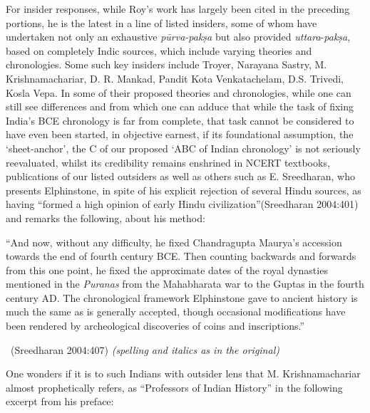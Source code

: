 For insider responses, while Roy’s work has largely been cited in the preceding portions, he is the latest in a line of listed insiders, some of whom have undertaken not only an exhaustive \textit{pūrva-pakṣa} but also provided \textit{uttara}-\textit{pakṣa}, based on completely Indic sources, which include varying theories and chronologies. Some such key insiders include Troyer, Narayana Sastry, M. Krishnamachariar, D. R. Mankad, Pandit Kota Venkatachelam, D.S. Trivedi, Kosla Vepa. In some of their proposed theories and chronologies, while one can still see differences and from which one can adduce that while the task of fixing India’s BCE chronology is far from complete, that task cannot be considered to have even been started, in objective earnest, if its foundational assumption, the ‘sheet-anchor’, the C of our proposed ‘ABC of Indian chronology’ is not seriously reevaluated, whilst its credibility remains enshrined in NCERT textbooks, publications of our listed outsiders as well as others such as E. Sreedharan, who presents Elphinstone, in spite of his explicit rejection of several Hindu sources, as having “formed a high opinion of early Hindu civilization”(Sreedharan 2004:401) and remarks the following, about his method:

\begin{myquote}
“And now, without any difficulty, he fixed Chandragupta Maurya’s accession towards the end of fourth century BCE. Then counting backwards and forwards from this one point, he fixed the approximate dates of the royal dynasties mentioned in the \textit{Puranas} from the Mahabharata war to the Guptas in the fourth century AD. The chronological framework Elphinstone gave to ancient history is much the same as is generally accepted, though occasional modifications have been rendered by archeological discoveries of coins and inscriptions.” 

~\hfill (Sreedharan 2004:407) \textit{(spelling and italics as in the original)}
\end{myquote}

One wonders if it is to such Indians with outsider lens that M. Krishnamachariar almost prophetically refers, as “Professors of Indian History” in the following excerpt from his preface:


